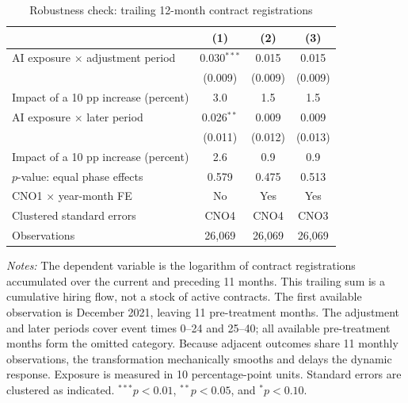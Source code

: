 \begin{table}[H]
\centering
\caption{Robustness check: trailing 12-month contract registrations}
\label{tab:v1_trailing_contracts}
\begin{threeparttable}
\small
\begin{tabular}{lccc}
\toprule
& (1) & (2) & (3) \\
\midrule
AI exposure $\times$ adjustment period & 0.030$^{***}$ & 0.015 & 0.015 \\
 & (0.009) & (0.009) & (0.009) \\
Impact of a 10 pp increase (percent) & 3.0 & 1.5 & 1.5 \\
\addlinespace
AI exposure $\times$ later period & 0.026$^{**}$ & 0.009 & 0.009 \\
 & (0.011) & (0.012) & (0.013) \\
Impact of a 10 pp increase (percent) & 2.6 & 0.9 & 0.9 \\
$p$-value: equal phase effects & 0.579 & 0.475 & 0.513 \\
\midrule
CNO1 $\times$ year-month FE & No & Yes & Yes \\
Clustered standard errors & CNO4 & CNO4 & CNO3 \\
Observations & 26,069 & 26,069 & 26,069 \\
\bottomrule
\end{tabular}
\begin{tablenotes}[flushleft]
\footnotesize
\item \emph{Notes:} The dependent variable is the logarithm of contract registrations accumulated over the current and preceding 11 months. This trailing sum is a cumulative hiring flow, not a stock of active contracts. The first available observation is December 2021, leaving 11 pre-treatment months. The adjustment and later periods cover event times 0--24 and 25--40; all available pre-treatment months form the omitted category. Because adjacent outcomes share 11 monthly observations, the transformation mechanically smooths and delays the dynamic response. Exposure is measured in 10 percentage-point units. Standard errors are clustered as indicated. $^{***}p<0.01$, $^{**}p<0.05$, and $^{*}p<0.10$.
\end{tablenotes}
\end{threeparttable}
\end{table}
